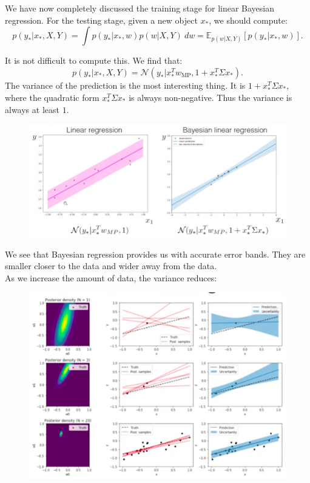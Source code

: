 We have now completely discussed the training stage for linear Bayesian regression. For the testing stage, given a new object $x_*$, we should compute:
\begin{equation*}
p(y_* | x_*, X, Y) = \int p(y_* | x_*, w) p(w | X, Y)\ dw = \mathbb{E}_{p(w|X,Y)} \left[ p(y_* | x_*, w) \right].
\end{equation*}

It is not difficult to compute this. We find that:
\begin{equation*}
p(y_* | x_*, X, Y) = \mathcal{N}(y_* | x_*^T w_{\text{MP}}, 1 + x_*^T \Sigma x_* ).
\end{equation*}
The variance of the prediction is the most interesting thing. It is $1 + x_*^T \Sigma x_*$, where the quadratic form $x_*^T \Sigma x_*$ is always non-negative. Thus the variance is always at least $1$. 
\begin{figure}[H]
\centering
\includegraphics[scale=0.4]{variancebayesianregression.png}
\end{figure}
We see that Bayesian regression provides us with accurate error bands. They are smaller closer to the data and wider away from the data.\\

As we increase the amount of data, the variance reduces:
\begin{figure}[H]
\centering
\includegraphics[scale=0.4]{moredatavariance.png}
\end{figure}





